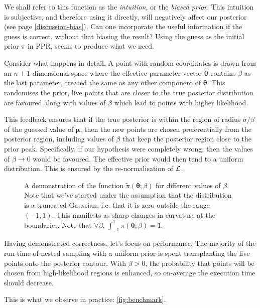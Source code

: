 \documentclass[usenatbib]{mnras}
\begin{document}
We shall refer to this function as the \emph{intuition}, or the \emph{biased
prior}. This intuition is subjective, and therefore using it
directly, will negatively affect our posterior (see page
\autoref{discussion-bias}). Can one incorporate the useful
information if the guess is correct, without that biasing the
result? Using the guess as the initial prior \(\pi\) in PPR, seems to
produce what we need.

Consider what happens in detail. A point with random coordinates is
drawn from an \(n+1\) dimensional space where the effective
parameter vector \(\tilde{\bm{\theta}}\) contains \(\beta\) as
the last parameter, treated the same as any other component of
\(\bm{\theta}\). This randomises the prior, live points that are closer to
the true posterior distribution are favoured along with values of
\(\beta\) which lead to points with higher likelihood.  

This feedback ensures that if the true posterior is within the
region of radius \(\sigma / \beta\) of the guessed value of
\(\bm{\mu}\), then the new points are chosen preferentially from the
posterior region, including values of \(\beta\) that keep the
posterior region close to the prior peak. Specifically, if our
hypothesis were completely wrong, then the values of \(\beta
   \rightarrow 0\) would be favoured. The effective prior would then
tend to a uniform distribution. This is ensured by the
re-normalisation of \({\cal L}\).

\begin{figure}
 
\caption{\label{orgc27c450}
A demonstration of the function \(\tilde{\pi}(\bm{\theta}; \beta)\) for different values of \(\beta\). Note that we've started under the assumption that the distribution is a truncated Gaussian, i.e. that it is zero outside the range \((-1, 1)\). This manifests as sharp changes in curvature at the boundaries. Note that \(\forall \beta\), \(\int_{-1}^{1}\tilde{\pi}(\bm{\theta}; \beta) = 1\).}
\end{figure}

Having demonstrated correctness, let's focus on performance. The
majority of the run-time of nested sampling with a uniform prior is
spent transplanting the live points onto the posterior
contour. With \(\beta>0\), the probability that points will be chosen
from high-likelihood regions is enhanced, so on-average the
execution time should decrease.

This is what we observe in practice: \autoref{fig:benchmark}. 
\end{document}
